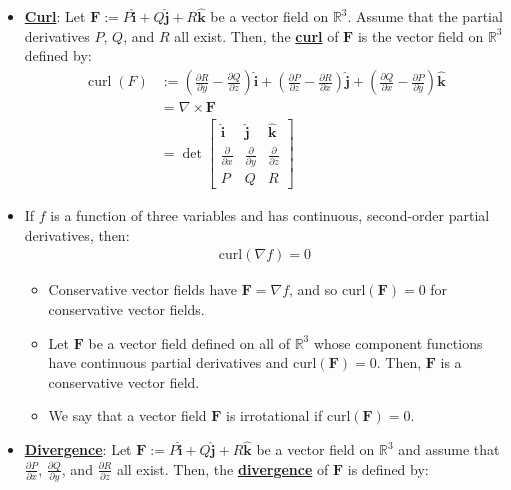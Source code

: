 \documentclass[reqno,11pt]{amsart}
\theoremstyle{definition}
\theoremstyle{remark}
\newcommand{\R}{\mathbb{R}}
\newcommand{\dfn}[1]{\underline{\textbf{#1}}}
\begin{document}
\begin{itemize}[noitemsep]
	\item \dfn{Curl}: Let $\mathbf{F} := P \hat{\mathbf{i}} + Q \hat{\mathbf{j}} + R \hat{\mathbf{k}}$ be a vector field on $\R^3$. Assume that the partial derivatives $P$, $Q$, and $R$ all exist. Then, the \dfn{curl} of $\mathbf{F}$ is the vector field on $\R^3$ defined by: 
	\begin{align*}
		\operatorname{curl}(F) & := \left( \frac{\partial R}{\partial y} - \frac{\partial Q}{\partial z}   \right) \hat{\mathbf{i}} + \left( \frac{\partial P}{\partial z} - \frac{\partial R}{\partial x} \right) \hat{\mathbf{j}} + \left( \frac{\partial Q}{\partial x} - \frac{\partial P}{\partial y} \right) \hat{\mathbf{k}} \\
		& = \nabla \times \mathbf{F} \\
		& = \det \begin{bmatrix}
			\hat{\mathbf{i}} & \hat{\mathbf{j}} & \hat{\mathbf{k}} \\
			\frac{\partial}{\partial x} & \frac{\partial }{\partial y} & \frac{\partial }{\partial z} \\
			P & Q & R
		\end{bmatrix}
	\end{align*}
	\item If $f$ is a function of three variables and has continuous, second-order partial derivatives, then:
	\begin{align}
		\text{curl}(\nabla f) = 0 	
	\end{align}
	\begin{itemize}[noitemsep]
		\item Conservative vector fields have $\mathbf{F} = \nabla f$, and so $\text{curl}(\mathbf{F}) = 0$ for conservative vector fields.
		\item Let $\mathbf{F}$ be a vector field defined on all of $\R^3$ whose component functions have continuous partial derivatives and $\text{curl}(\mathbf{F}) = 0$. Then, $\mathbf{F}$ is a conservative vector field. 
		\item We say that a vector field $\mathbf{F}$ is irrotational if $\text{curl}(\mathbf{F})=0$.
	\end{itemize}
	\item \dfn{Divergence}: Let $\mathbf{F} := P \hat{\mathbf{i}} + Q \hat{\mathbf{j}} + R \hat{\mathbf{k}}$ be a vector field on $\R^3$ and assume that $\frac{\partial P}{\partial x }$, $\frac{\partial Q}{\partial y}$, and $\frac{\partial R}{\partial z}$ all exist. Then, the \dfn{divergence} of $\mathbf{F}$ is defined by:

\end{itemize}
\end{document}
